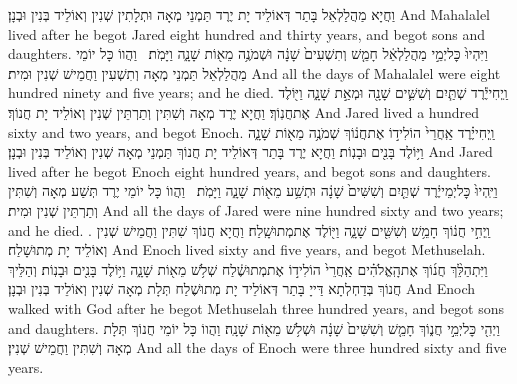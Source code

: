 {וַחֲיָא מַהֲלַלְאֵל בָּתַר דְּאוֹלֵיד יָת יֶרֶד תַּמְנֵי מְאָה וּתְלָתִין שְׁנִין וְאוֹלֵיד בְּנִין וּבְנָן׃}
{And Mahalalel lived after he begot Jared eight hundred and thirty years, and begot sons and daughters.}{}
{וַיִּהְיוּ֙ כׇּל\maqqaf יְמֵ֣י מַהֲלַלְאֵ֔ל חָמֵ֤שׁ וְתִשְׁעִים֙ שָׁנָ֔ה וּשְׁמֹנֶ֥ה מֵא֖וֹת שָׁנָ֑ה וַיָּמֹֽת׃ \setuma }
{וַהֲווֹ כָּל יוֹמֵי מַהֲלַלְאֵל תַּמְנֵי מְאָה וְתִשְׁעִין וַחֲמֵישׁ שְׁנִין וּמִית׃}
{And all the days of Mahalalel were eight hundred ninety and five years; and he died.}{}
{וַֽיְחִי\maqqaf יֶ֕רֶד שְׁתַּ֧יִם וְשִׁשִּׁ֛ים שָׁנָ֖ה וּמְאַ֣ת שָׁנָ֑ה וַיּ֖וֹלֶד אֶת\maqqaf חֲנֽוֹךְ׃}
{וַחֲיָא יֶרֶד מְאָה וְשִׁתִּין וְתַרְתֵּין שְׁנִין וְאוֹלֵיד יָת חֲנוֹךְ׃}
{And Jared lived a hundred sixty and two years, and begot Enoch.}{}
{וַֽיְחִי\maqqaf יֶ֗רֶד אַֽחֲרֵי֙ הוֹלִיד֣וֹ אֶת\maqqaf חֲנ֔וֹךְ שְׁמֹנֶ֥ה מֵא֖וֹת שָׁנָ֑ה וַיּ֥וֹלֶד בָּנִ֖ים וּבָנֽוֹת׃}
{וַחֲיָא יֶרֶד בָּתַר דְּאוֹלֵיד יָת חֲנוֹךְ תַּמְנֵי מְאָה שְׁנִין וְאוֹלֵיד בְּנִין וּבְנָן׃}
{And Jared lived after he begot Enoch eight hundred years, and begot sons and daughters.}{}
{וַיִּֽהְיוּ֙ כׇּל\maqqaf יְמֵי\maqqaf יֶ֔רֶד שְׁתַּ֤יִם וְשִׁשִּׁים֙ שָׁנָ֔ה וּתְשַׁ֥ע מֵא֖וֹת שָׁנָ֑ה וַיָּמֹֽת׃ \setuma }
{וַהֲווֹ כָּל יוֹמֵי יֶרֶד תְּשַׁע מְאָה וְשִׁתִּין וְתַרְתֵּין שְׁנִין וּמִית׃}
{And all the days of Jared were nine hundred sixty and two years; and he died. .}{}
{וַֽיְחִ֣י חֲנ֔וֹךְ חָמֵ֥שׁ וְשִׁשִּׁ֖ים שָׁנָ֑ה וַיּ֖וֹלֶד אֶת\maqqaf מְתוּשָֽׁלַח׃}
{וַחֲיָא חֲנוֹךְ שִׁתִּין וַחֲמֵישׁ שְׁנִין וְאוֹלֵיד יָת מְתוּשָׁלַח׃}
{And Enoch lived sixty and five years, and begot Methuselah.}{}
{וַיִּתְהַלֵּ֨ךְ חֲנ֜וֹךְ אֶת\maqqaf הָֽאֱלֹהִ֗ים אַֽחֲרֵי֙ הוֹלִיד֣וֹ אֶת\maqqaf מְתוּשֶׁ֔לַח שְׁלֹ֥שׁ מֵא֖וֹת שָׁנָ֑ה וַיּ֥וֹלֶד בָּנִ֖ים וּבָנֽוֹת׃}
{וְהַלֵּיךְ חֲנוֹךְ בְּדַחְלְתָא דַּייָ בָּתַר דְּאוֹלֵיד יָת מְתוּשֶׁלַח תְּלָת מְאָה שְׁנִין וְאוֹלֵיד בְּנִין וּבְנָן׃}
{And Enoch walked with God after he begot Methuselah three hundred years, and begot sons and daughters.}{}
{וַיְהִ֖י כׇּל\maqqaf יְמֵ֣י חֲנ֑וֹךְ חָמֵ֤שׁ וְשִׁשִּׁים֙ שָׁנָ֔ה וּשְׁלֹ֥שׁ מֵא֖וֹת שָׁנָֽה׃}
{וַהֲווֹ כָּל יוֹמֵי חֲנוֹךְ תְּלָת מְאָה וְשִׁתִּין וַחֲמֵישׁ שְׁנִין׃}
{And all the days of Enoch were three hundred sixty and five years.}{}
